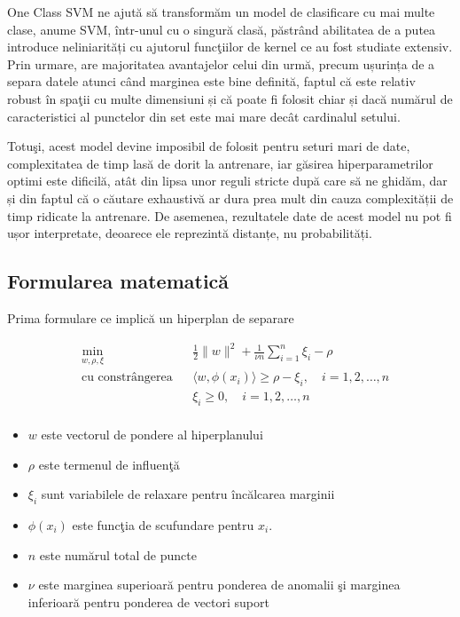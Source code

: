 One Class SVM ne ajută să transformăm un model de clasificare 
cu mai multe clase, anume SVM, într-unul cu o singură clasă,
păstrând abilitatea de a putea introduce neliniarități 
cu ajutorul funcţiilor de kernel ce au fost studiate extensiv.
Prin urmare, are majoritatea avantajelor celui din urmă, precum
ușurința de a separa datele atunci când marginea este bine 
definită, faptul că este relativ robust în spaţii cu 
multe dimensiuni și că poate fi folosit chiar și dacă 
numărul de caracteristici al punctelor din set este mai
mare decât cardinalul setului.

Totuşi, acest model devine imposibil de folosit pentru 
seturi mari de date, complexitatea de timp lasă de dorit 
la antrenare, iar găsirea hiperparametrilor optimi este 
dificilă, atât din lipsa unor reguli stricte după care 
să ne ghidăm, dar și din faptul că o căutare exhaustivă 
ar dura prea mult din cauza complexității de timp ridicate 
la antrenare. De asemenea, rezultatele date de acest model 
nu pot fi ușor interpretate, deoarece ele reprezintă distanțe,
nu probabilități.

\subsection{Formularea matematică}

Prima formulare ce implică un hiperplan de separare

\begin{equation}
    \begin{aligned}
    & \underset{w, \rho, \xi}{\text{min}}
    & & \frac{1}{2} \|w\|^2 + \frac{1}{\nu n} \sum_{i=1}^{n} \xi_i - \rho \\
    & \text{cu constrângerea}
    & & \langle w, \phi(x_i) \rangle \geq \rho - \xi_i, \quad i=1,2,\ldots,n \\
    &&& \xi_i \geq 0, \quad i=1,2,\ldots,n \\
    \end{aligned}
    \end{equation}
    
    \begin{itemize}
        \item $w$ este vectorul de pondere al hiperplanului
        \item $\rho$ este termenul de influenţă
        \item $\xi_i$ sunt variabilele de relaxare pentru încălcarea marginii
        \item $\phi(x_i)$ este funcţia de scufundare pentru $x_i$.
        \item $n$ este numărul total de puncte
        \item $\nu$ este marginea superioară pentru ponderea de anomalii şi marginea 
        inferioară pentru ponderea de vectori suport
    
    \end{itemize}


